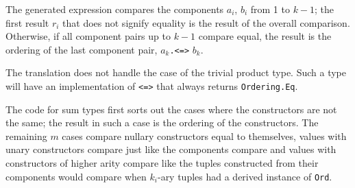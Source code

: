 The generated expression compares the components $a_i$, $b_i$ from 1 to $k-1$; the first result $r_i$ that does not signify equality is the result of the overall comparison. Otherwise, if all component pairs up to ${k-1}$ compare equal, the result is the ordering of the last component pair, $a_k$\texttt{.<=>} $b_k$.

The translation does not handle the case of the trivial product type. Such a type will have an implementation of \texttt{<=>} that always returns \texttt{Ordering.Eq}.

The code for sum types first sorts out the cases where the constructors are not the same; the result in such a case is the ordering of the constructors. The remaining $m$ cases compare nullary constructors equal to themselves, values with unary constructors compare just like the components compare and values with constructors of higher arity compare like the tuples constructed from their components would compare when $k_i$-ary tuples had a derived instance of \texttt{Ord}.

